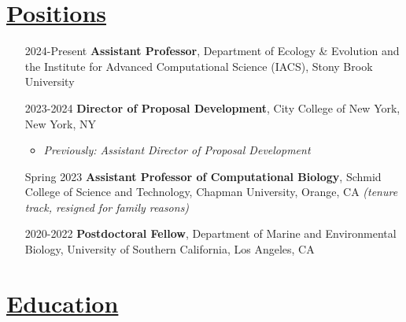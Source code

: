 \documentclass[]{res}
\begin{document}
 
 \small
{} %
 
 

\address{{\bf pronouns:} they/them/theirs {\emph{or}} she/her/hers\\ {\bf email:} jackie.weissman@stonybrook.edu}
\address{{\bf website:} https://microbialgamut.com/}%

 
\begin{resume} 
 

 \section{\underline{Positions}} %
\begin{enumerate}
\setlength\itemsep{0.2em}
\item[2024-Present] {\bf Assistant Professor}, Department of Ecology \& Evolution and the Institute for Advanced Computational Science (IACS), Stony Brook University
\item[2023-2024] {\bf Director of Proposal Development}, City College of New York, New York, NY
\begin{itemize}[leftmargin=*]
\item \emph{Previously: Assistant Director of Proposal Development}
\end{itemize}
\item[Spring 2023] {\bf Assistant Professor of Computational Biology}, Schmid College of Science and Technology, Chapman University, Orange, CA \emph{(tenure track, resigned for family reasons)}
\item[2020-2022] {\bf Postdoctoral Fellow}, Department of Marine and Environmental Biology, University of Southern California, Los Angeles, CA
\end{enumerate}

\section{\underline{Education}} %


\end{resume}
\end{document}
